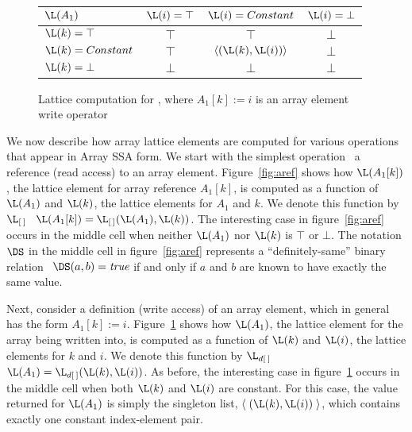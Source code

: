 \begin{figure}%
\begin{center}
\begin{tabular}{|l||c|c|c|}
\hline
$\L(A_1)$ & $\L(i) = \top$ & $\L(i) = Constant$ & $\L(i) = \bot$ \\
\hline \hline
$\L(k) = \top$ & $\top$ & $\top$ & $\bot$ \\
\hline
$\L(k) = Constant$ & $\top$ & $\langle(\L(k),\L(i))\rangle$ & $\bot$ \\
\hline
$\L(k) = \bot$ & $\bot$ & $\bot$ & $\bot$ \\
\hline
\end{tabular}
\end{center}
\caption{Lattice computation for ,
where $A_1[k] := i$ is an 
array element write operator}
\label{fig:adef}
\end{figure}

We now describe how array lattice elements are computed for various
operations that appear in Array SSA form.  We start with the simplest operation
\viz\ a reference (read access) to an array element.
Figure~\ref{fig:aref} shows how $\L(A_1[k])$, the lattice element for array
reference $A_1[k]$, is computed as a function of $\L(A_1)$ and $\L(k)$, 
the lattice elements for $A_1$ and $k$.
We denote this function
by $\L_{[\:]}$ \ie\ $\L(A_1[k]) = \L_{[\:]}(\L(A_1),\L(k))$.  
The interesting case in figure~\ref{fig:aref} occurs
in the middle cell
when neither $\L(A_1)$ nor $\L(k)$ is $\top$ or $\bot$.
The notation $\DS$ in the middle cell in figure~\ref{fig:aref}
represents a ``definitely-same'' binary relation \ie\ $\DS(a,b) =
\mbox{\it true}$ if and only if $a$ and $b$ are known to have exactly
the same value.  %

Next, consider a definition (write access) of an array element, which 
in general has the form $A_1[k] := i$.
Figure~\ref{fig:adef} shows how $\L(A_1)$, the lattice element for 
the array being written into,
is computed as a function of $\L(k)$ and $\L(i)$, 
the lattice elements for $k$ and $i$.  We denote this function
by $\L_{d[\:]}$ \ie\ $\L(A_1) = \L_{d[\:]}(\L(k),\L(i))$.  
As before,
the interesting case in figure~\ref{fig:adef} occurs
in the middle cell
when both $\L(k)$ and $\L(i)$ are constant.
For this case, the value returned for $\L(A_1)$ is simply 
the singleton list,
$\langle\;(\L(k),\L(i))\;\rangle$, which contains exactly
one constant index-element pair.


